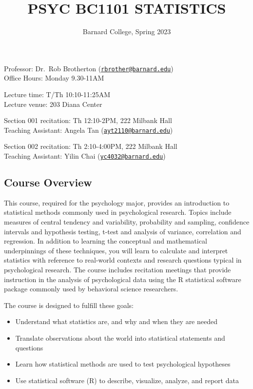 \documentclass[
  letterpaper,
  DIV=11,
  numbers=noendperiod]{scrartcl}
\title{PSYC BC1101 STATISTICS}
\subtitle{Barnard College, Spring 2023}
\author{}
\date{}
\providecommand{\tightlist}{%
  \setlength{\itemsep}{0pt}\setlength{\parskip}{0pt}}\usepackage{longtable,booktabs,array}
\begin{document}
\maketitle
\ifdefined\Shaded\renewenvironment{Shaded}{\begin{tcolorbox}[breakable, sharp corners, frame hidden, interior hidden, boxrule=0pt, borderline west={3pt}{0pt}{shadecolor}, enhanced]}{\end{tcolorbox}}\fi

Professor: Dr.~Rob Brotherton
(\href{mailto:rbrother@barnard.edu}{\nolinkurl{rbrother@barnard.edu}})\\
Office Hours: Monday 9.30-11AM

Lecture time: T/Th 10:10-11:25AM\\
Lecture venue: 203 Diana Center

Section 001 recitation: Th 12:10-2PM, 222 Milbank Hall\\
Teaching Assistant: Angela Tan
(\href{mailto:ayt2110@barnard.edu}{\nolinkurl{ayt2110@barnard.edu}})

Section 002 recitation: Th 2:10-4:00PM, 222 Milbank Hall\\
Teaching Assistant: Yilin Chai
(\href{mailto:yc4032@barnard.edu}{\nolinkurl{yc4032@barnard.edu}})

\hypertarget{course-overview}{%
\subsection{Course Overview}\label{course-overview}}

This course, required for the psychology major, provides an introduction
to statistical methods commonly used in psychological research. Topics
include measures of central tendency and variability, probability and
sampling, confidence intervals and hypothesis testing, t-test and
analysis of variance, correlation and regression. In addition to
learning the conceptual and mathematical underpinnings of these
techniques, you will learn to calculate and interpret statistics with
reference to real-world contexts and research questions typical in
psychological research. The course includes recitation meetings that
provide instruction in the analysis of psychological data using the R
statistical software package commonly used by behavioral science
researchers.

The course is designed to fulfill these goals:

\begin{itemize}
\tightlist
\item
  Understand what statistics are, and why and when they are needed
\item
  Translate observations about the world into statistical statements and
  questions
\item
  Learn how statistical methods are used to test psychological
  hypotheses
\item
  Use statistical software (R) to describe, visualize, analyze, and
  report data
\end{itemize}
\end{document}
